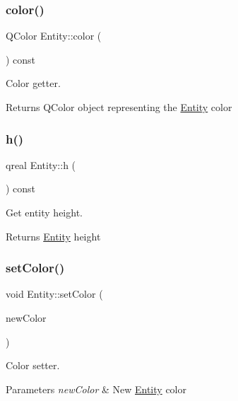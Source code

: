\subsubsection{\texorpdfstring{color()}{color()}}
{\footnotesize\ttfamily Q\+Color Entity\+::color (\begin{DoxyParamCaption}{ }\end{DoxyParamCaption}) const}



Color getter. 

\begin{DoxyReturn}{Returns}
Q\+Color object representing the \hyperlink{class_entity}{Entity} color 
\end{DoxyReturn}
\mbox{\label{class_entity_a639fea375adab80851778acb51757fb8}} 
\subsubsection{\texorpdfstring{h()}{h()}}
{\footnotesize\ttfamily qreal Entity\+::h (\begin{DoxyParamCaption}{ }\end{DoxyParamCaption}) const}



Get entity height. 

\begin{DoxyReturn}{Returns}
\hyperlink{class_entity}{Entity} height 
\end{DoxyReturn}
\mbox{\label{class_entity_a7b88e2198ec04871dcec523d1e02e656}} 
\subsubsection{\texorpdfstring{set\+Color()}{setColor()}}
{\footnotesize\ttfamily void Entity\+::set\+Color (\begin{DoxyParamCaption}\item[{const Q\+Color}]{new\+Color }\end{DoxyParamCaption})}



Color setter. 


\begin{DoxyParams}{Parameters}
{\em new\+Color} & New \hyperlink{class_entity}{Entity} color \\
\hline
\end{DoxyParams}
\mbox{\label{class_entity_a351a26475f8c124429a638483e95fa8e}} 
